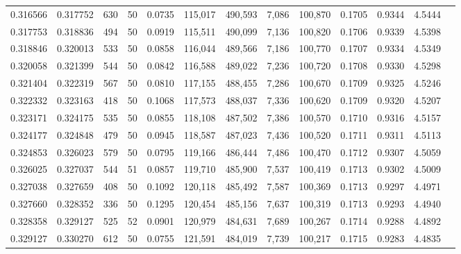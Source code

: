 \begin{tabular}{rrrrrrrrrrrrr}
0.316566 & 0.317752 &   630 &  50 &                                     0.0735 & 115,017 & 490,593 &   7,086 & 100,870 & 0.1705 & 0.9344 & 4.5444 \\
0.317753 & 0.318836 &   494 &  50 &                                     0.0919 & 115,511 & 490,099 &   7,136 & 100,820 & 0.1706 & 0.9339 & 4.5398 \\
0.318846 & 0.320013 &   533 &  50 &                                     0.0858 & 116,044 & 489,566 &   7,186 & 100,770 & 0.1707 & 0.9334 & 4.5349 \\
0.320058 & 0.321399 &   544 &  50 &                                     0.0842 & 116,588 & 489,022 &   7,236 & 100,720 & 0.1708 & 0.9330 & 4.5298 \\
0.321404 & 0.322319 &   567 &  50 &                                     0.0810 & 117,155 & 488,455 &   7,286 & 100,670 & 0.1709 & 0.9325 & 4.5246 \\
0.322332 & 0.323163 &   418 &  50 &                                     0.1068 & 117,573 & 488,037 &   7,336 & 100,620 & 0.1709 & 0.9320 & 4.5207 \\
0.323171 & 0.324175 &   535 &  50 &                                     0.0855 & 118,108 & 487,502 &   7,386 & 100,570 & 0.1710 & 0.9316 & 4.5157 \\
0.324177 & 0.324848 &   479 &  50 &                                     0.0945 & 118,587 & 487,023 &   7,436 & 100,520 & 0.1711 & 0.9311 & 4.5113 \\
0.324853 & 0.326023 &   579 &  50 &                                     0.0795 & 119,166 & 486,444 &   7,486 & 100,470 & 0.1712 & 0.9307 & 4.5059 \\
0.326025 & 0.327037 &   544 &  51 &                                     0.0857 & 119,710 & 485,900 &   7,537 & 100,419 & 0.1713 & 0.9302 & 4.5009 \\
0.327038 & 0.327659 &   408 &  50 &                                     0.1092 & 120,118 & 485,492 &   7,587 & 100,369 & 0.1713 & 0.9297 & 4.4971 \\
0.327660 & 0.328352 &   336 &  50 &                                     0.1295 & 120,454 & 485,156 &   7,637 & 100,319 & 0.1713 & 0.9293 & 4.4940 \\
0.328358 & 0.329127 &   525 &  52 &                                     0.0901 & 120,979 & 484,631 &   7,689 & 100,267 & 0.1714 & 0.9288 & 4.4892 \\
0.329127 & 0.330270 &   612 &  50 &                                     0.0755 & 121,591 & 484,019 &   7,739 & 100,217 & 0.1715 & 0.9283 & 4.4835 \\

\end{tabular}
